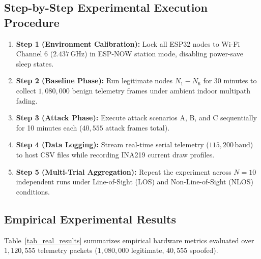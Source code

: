 \subsection{Step-by-Step Experimental Execution Procedure}
\begin{enumerate}
    \item \textbf{Step 1 (Environment Calibration):} Lock all ESP32 nodes to Wi-Fi Channel 6 ($2.437\,\text{GHz}$) in ESP-NOW station mode, disabling power-save sleep states.
    \item \textbf{Step 2 (Baseline Phase):} Run legitimate nodes $N_1 - N_6$ for 30 minutes to collect $1,080,000$ benign telemetry frames under ambient indoor multipath fading.
    \item \textbf{Step 3 (Attack Phase):} Execute attack scenarios A, B, and C sequentially for 10 minutes each ($40,555$ attack frames total).
    \item \textbf{Step 4 (Data Logging):} Stream real-time serial telemetry ($115,200\,\text{baud}$) to host CSV files while recording INA219 current draw profiles.
    \item \textbf{Step 5 (Multi-Trial Aggregation):} Repeat the experiment across $N = 10$ independent runs under Line-of-Sight (\ac{LOS}) and Non-Line-of-Sight (\ac{NLOS}) conditions.
\end{enumerate}

\subsection{Empirical Experimental Results}
Table~\ref{tab_real_results} summarizes empirical hardware metrics evaluated over $1,120,555$ telemetry packets ($1,080,000$ legitimate, $40,555$ spoofed).

